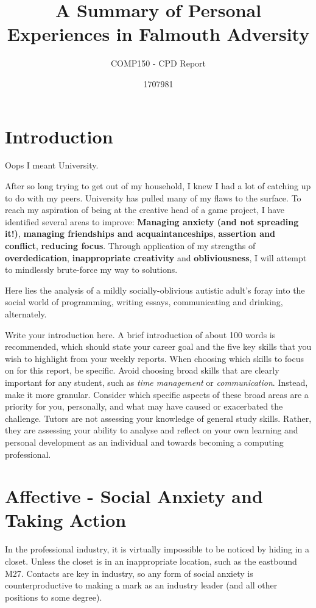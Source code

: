 \documentclass{scrartcl}
\title{A Summary of Personal Experiences in Falmouth Adversity}
\subtitle{COMP150 - CPD Report}
\author{1707981}
\begin{document}
\maketitle

\section{Introduction}
Oops I meant University.

After so long trying to get out of my household, I knew I had a lot of catching up to do with my peers. University has pulled many of my flaws to the surface. To reach my aspiration of being at the creative head of a game project, I have identified several areas to improve: \textbf{Managing anxiety (and not spreading it!)}, \textbf{managing friendships and acquaintanceships}, \textbf{assertion and conflict}, \textbf{reducing focus}. Through application of my strengths of \textbf{overdedication}, \textbf{inappropriate creativity} and \textbf{obliviousness}, I will attempt to mindlessly brute-force my way to solutions.

Here lies the analysis of a mildly socially-oblivious autistic adult's foray into the social world of programming, writing essays, communicating and drinking, alternately.

Write your introduction here. A brief introduction of about 100 words is recommended, which should state your career goal and the five key skills that you wish to highlight from your weekly reports. When choosing which skills to focus on for this report, be specific. Avoid choosing broad skills that are clearly important for any student, such as \textit{time management} or \textit{communication}. Instead, make it more granular. Consider which specific aspects of these broad areas are a priority for you, personally, and what may have caused or exacerbated the challenge. Tutors are not assessing your knowledge of general study skills. Rather, they are assessing your ability to analyse and reflect on your own learning and personal development as an individual and towards becoming a computing professional.

\section{Affective - Social Anxiety and Taking Action}
In the professional industry, it is virtually impossible to be noticed by hiding in a closet. Unless the closet is in an inappropriate location, such as the eastbound M27. Contacts are key in industry, so any form of social anxiety is counterproductive to making a mark as an industry leader (and all other positions to some degree).
\end{document}
